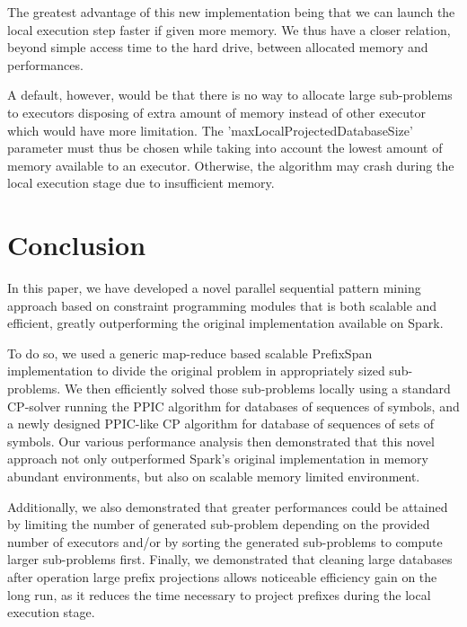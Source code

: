 \documentclass{eplmastersthesis}
\begin{document}
The greatest advantage of this new implementation being that we can launch the local execution step faster if given more memory. We thus have a closer relation, beyond simple access time to the hard drive, between allocated memory and performances. \newline

A default, however, would be that there is no way to allocate large sub-problems to executors disposing of extra amount of memory instead of other executor which would have more limitation. The 'maxLocalProjectedDatabaseSize' parameter must thus be chosen while taking into account the lowest amount of memory available to an executor. Otherwise, the algorithm may crash during the local execution stage due to insufficient memory.

\newpage
\section{Conclusion}

In this paper, we have developed a novel parallel sequential pattern mining approach based on constraint programming modules that is both scalable and efficient, greatly outperforming the original implementation available on Spark.\newline

To do so, we used a generic map-reduce based scalable PrefixSpan implementation to divide the original problem in appropriately sized sub-problems. We then efficiently solved those sub-problems locally using a standard CP-solver running the PPIC algorithm for databases of sequences of symbols, and a newly designed PPIC-like CP algorithm for database of sequences of sets of symbols. Our various performance analysis then demonstrated that this novel approach not only outperformed Spark's original implementation in memory abundant environments, but also on scalable memory limited environment. \newline

Additionally, we also demonstrated that greater performances could be attained by limiting the number of generated sub-problem depending on the provided number of executors and/or by sorting the generated sub-problems to compute larger sub-problems first. Finally, we demonstrated that cleaning large databases after operation large prefix projections allows noticeable efficiency gain on the long run, as it reduces the time necessary to project prefixes during the local execution stage. \newline
\end{document}
